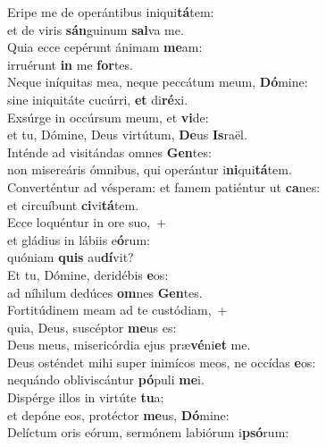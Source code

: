 \evenverse Eripe me de operántibus iniqui\textbf{tá}tem:~\*\\
\evenverse et de viris \textbf{sán}guinum \textbf{sal}va me.\\
\oddverse Quia ecce cepérunt ánimam \textbf{me}am:~\*\\
\oddverse irruérunt \textbf{in} me \textbf{for}tes.\\
\evenverse Neque iníquitas mea, neque peccátum meum, \textbf{Dó}mine:~\*\\
\evenverse sine iniquitáte cucúrri, \textbf{et} di\textbf{ré}xi.\\
\oddverse Exsúrge in occúrsum meum, et \textbf{vi}de:~\*\\
\oddverse et tu, Dómine, Deus virtútum, \textbf{De}us \textbf{Is}raël.\\
\evenverse Inténde ad visitándas omnes \textbf{Gen}tes:~\*\\
\evenverse non misereáris ómnibus, qui operántur i\textbf{ni}qui\textbf{tá}tem.\\
\oddverse Converténtur ad vésperam: et famem patiéntur ut \textbf{ca}nes:~\*\\
\oddverse et circuíbunt \textbf{ci}vi\textbf{tá}tem.\\
\evenverse Ecce loquéntur in ore suo,~+\\
\evenverse  et gládius in lábiis e\textbf{ó}rum:~\*\\
\evenverse quóniam \textbf{quis} au\textbf{dí}vit?\\
\oddverse Et tu, Dómine, deridébis \textbf{e}os:~\*\\
\oddverse ad níhilum dedúces \textbf{om}nes \textbf{Gen}tes.\\
\evenverse Fortitúdinem meam ad te custódiam,~+\\
\evenverse  quia, Deus, suscéptor \textbf{me}us es:~\*\\
\evenverse Deus meus, misericórdia ejus præ\textbf{vé}ni\textbf{et} me.\\
\oddverse Deus osténdet mihi super inimícos meos, ne occídas \textbf{e}os:~\*\\
\oddverse nequándo obliviscántur \textbf{pó}puli \textbf{me}i.\\
\evenverse Dispérge illos in virtúte \textbf{tu}a:~\*\\
\evenverse et depóne eos, protéctor \textbf{me}us, \textbf{Dó}mine:\\
\oddverse Delíctum oris eórum, sermónem labiórum i\textbf{psó}rum:~\*\\
